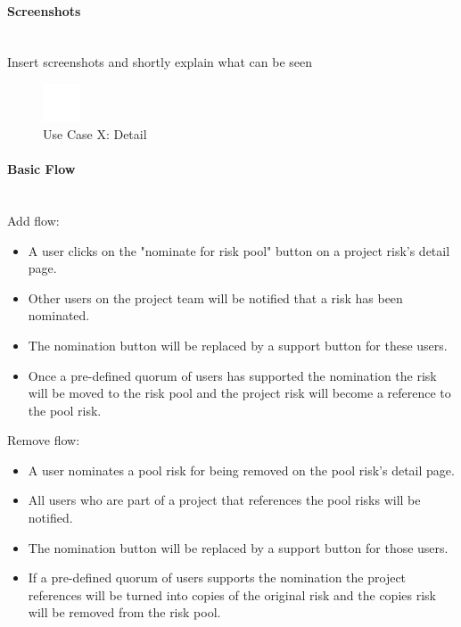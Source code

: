 \paragraph*{Screenshots}\mbox{}\\
Insert screenshots and shortly explain what can be seen
\begin{figure}[h] 
	\centering
	\includegraphics[width=0.1\textwidth]{Content/Domain/placeholder.png}
	\caption{Use Case X: Detail}
	\label{fig:label5}
\end{figure}

\paragraph*{Basic Flow} \mbox{}\\
Add flow:
\begin{itemize}
	\vspace{-3mm}
	\setlength\itemsep{-1em}
	\item A user clicks on the "nominate for risk pool" button on a project risk's detail page.
	\item Other users on the project team will be notified that a risk has been nominated.
	\item The nomination button will be replaced by a support button for these users.
	\item Once a pre-defined quorum of users has supported the nomination the risk will be moved to the risk pool and the project risk will become a reference to the pool risk.
\end{itemize}

Remove flow:
\begin{itemize}
	\vspace{-3mm}
	\setlength\itemsep{-1em}
	\item A user nominates a pool risk for being removed on the pool risk's detail page.
	\item All users who are part of a project that references the pool risks will be notified.
	\item The nomination button will be replaced by a support button for those users.
	\item If a pre-defined quorum of users supports the nomination the project references will be turned into copies of the original risk and the copies risk will be removed from the risk pool.
\end{itemize}

